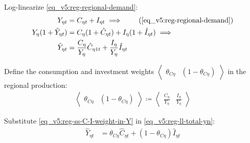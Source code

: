 \documentclass[../thesis.tex]{subfiles}
\begin{document}
\begin{tcolorbox}[colback=red!5!white,colframe=red!75!black]
	
Log-linearize \ref{eq_v5:reg-regional-demand}:
\begin{align}
	Y_{\eta t} &= C_{\eta t} + I_{\eta t} \implies \tag{\ref{eq_v5:reg-regional-demand}} \\
	Y_{\eta} (1 +\hat{Y}_{\eta t}) &= C_{\eta} (1 +\hat{C}_{\eta t}) + I_{\eta} (1 +\hat{I}_{\eta t}) \implies \nonumber \\
	\hat{Y}_{\eta t} &= \frac{C_{\eta}}{Y_{\eta}} \hat{C}_{\eta 1 t} + \frac{I_{\eta}}{Y_{\eta}} \hat{I}_{\eta t} \label{eq_v5:reg-ll-total-yn}
\end{align}

Define the consumption and investment weights $\left\langle \begin{smallmatrix} \theta_{C\eta} & (1 - \theta_{C\eta}) \end{smallmatrix} \right\rangle$ in the regional production:
\begin{align}
	\left\langle \begin{matrix} \theta_{C\eta} & (1 - \theta_{C\eta}) \end{matrix} \right\rangle \coloneq \left\langle \begin{matrix} \frac{C_{\eta}}{Y_{\eta}} & \frac{I_{\eta}}{Y_{\eta}} \end{matrix} \right\rangle \label{eq_v5:reg-ss-C-I-weight-in-Y}
\end{align}

Substitute \ref{eq_v5:reg-ss-C-I-weight-in-Y} in \ref{eq_v5:reg-ll-total-yn}:
\begin{align}
	\hat{Y}_{\eta t} &= \theta_{C\eta} \hat{C}_{\eta t} + (1 - \theta_{C\eta}) \hat{I}_{\eta t} \label{eq_v5:reg-ll-total-yn-2}
\end{align}

\end{tcolorbox}

\end{document}
